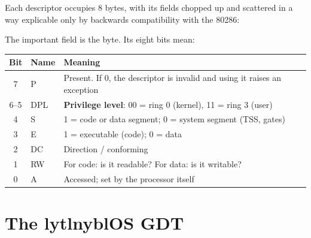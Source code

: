 Each descriptor occupies 8 bytes, with its fields chopped up and scattered in a way explicable only
by backwards compatibility with the 80286:

\begin{center}
\end{center}

The important field is the  byte. Its eight bits mean:

\begin{center}
\begin{tabularx}{\textwidth}{@{}c l X@{}}
\toprule
\textbf{Bit} & \textbf{Name} & \textbf{Meaning} \\
\midrule
7 & P    & Present. If 0, the descriptor is invalid and using it raises an exception \\
6--5 & DPL & \textbf{Privilege level}: 00 = ring 0 (kernel), 11 = ring 3 (user) \\
4 & S    & 1 = code or data segment; 0 = system segment (TSS, gates) \\
3 & E    & 1 = executable (code); 0 = data \\
2 & DC   & Direction / conforming \\
1 & RW   & For code: is it readable? For data: is it writable? \\
0 & A    & Accessed; set by the processor itself \\
\bottomrule
\end{tabularx}
\end{center}

\section{The lytlnyblOS GDT}

